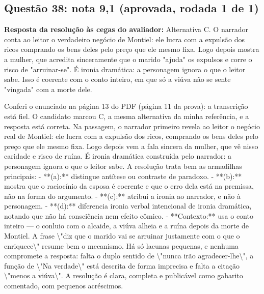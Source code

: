 \documentclass{article}%
\begin{document}
\subsection*{Questão 38: nota 9,1 (aprovada, rodada 1 de 1)}%
\textbf{Resposta da resolução às cegas do avaliador:} Alternativa C. O narrador conta ao leitor o verdadeiro negócio de Montiel: ele lucra com a expulsão dos ricos comprando os bens deles pelo preço que ele mesmo fixa. Logo depois mostra a mulher, que acredita sinceramente que o marido "ajuda" os expulsos e corre o risco de "arruinar{-}se". É ironia dramática: a personagem ignora o que o leitor sabe. Isso é coerente com o conto inteiro, em que só a viúva não se sente "vingada" com a morte dele.\par %
Conferi o enunciado na página 13 do PDF (página 11 da prova): a transcrição está fiel. O candidato marcou C, a mesma alternativa da minha referência, e a resposta está correta. Na passagem, o narrador primeiro revela ao leitor o negócio real de Montiel: ele lucra com a expulsão dos ricos, comprando os bens deles pelo preço que ele mesmo fixa. Logo depois vem a fala sincera da mulher, que vê nisso caridade e risco de ruína. É ironia dramática construída pelo narrador: a personagem ignora o que o leitor sabe.\newline%
\newline%
A resolução trata bem as armadilhas principais:\newline%
{-} **(a):** distingue antítese ou contraste de paradoxo.\newline%
{-} **(b):** mostra que o raciocínio da esposa é coerente e que o erro dela está na premissa, não na forma do argumento.\newline%
{-} **(c):** atribui a ironia ao narrador, e não à personagem.\newline%
{-} **(d):** diferencia ironia verbal intencional de ironia dramática, notando que não há consciência nem efeito cômico.\newline%
{-} **Contexto:** usa o conto inteiro --- o conluio com o alcaide, a viúva alheia e a ruína depois da morte de Montiel.\newline%
\newline%
A frase \textbackslash{}"diz que o marido vai se arruinar justamente com o que o enriquece\textbackslash{}" resume bem o mecanismo. Há só lacunas pequenas, e nenhuma compromete a resposta: falta o duplo sentido de \textbackslash{}"nunca irão agradecer{-}lhe\textbackslash{}", a função de \textbackslash{}"Na verdade\textbackslash{}" está descrita de forma imprecisa e falta a citação \textbackslash{}"menos a viúva\textbackslash{}". A resolução é clara, completa e publicável como gabarito comentado, com pequenos acréscimos.%
\end{document}
